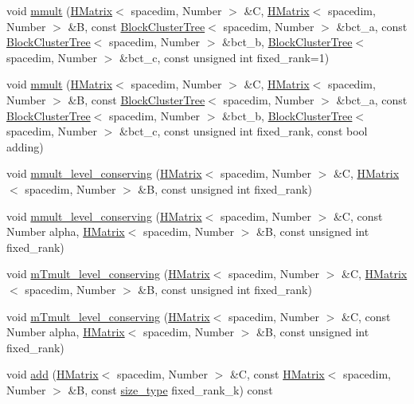 \begin{DoxyCompactItemize}
\item 
void \hyperlink{classHMatrix_af40d53aabc8bec86fa543638d48ba64e}{mmult} (\hyperlink{classHMatrix}{H\+Matrix}$<$ spacedim, Number $>$ \&C, \hyperlink{classHMatrix}{H\+Matrix}$<$ spacedim, Number $>$ \&B, const \hyperlink{classBlockClusterTree}{Block\+Cluster\+Tree}$<$ spacedim, Number $>$ \&bct\+\_\+a, const \hyperlink{classBlockClusterTree}{Block\+Cluster\+Tree}$<$ spacedim, Number $>$ \&bct\+\_\+b, \hyperlink{classBlockClusterTree}{Block\+Cluster\+Tree}$<$ spacedim, Number $>$ \&bct\+\_\+c, const unsigned int fixed\+\_\+rank=1)
\item 
void \hyperlink{classHMatrix_a4139e9069e3b18d4719c527ce2e0414c}{mmult} (\hyperlink{classHMatrix}{H\+Matrix}$<$ spacedim, Number $>$ \&C, \hyperlink{classHMatrix}{H\+Matrix}$<$ spacedim, Number $>$ \&B, const \hyperlink{classBlockClusterTree}{Block\+Cluster\+Tree}$<$ spacedim, Number $>$ \&bct\+\_\+a, const \hyperlink{classBlockClusterTree}{Block\+Cluster\+Tree}$<$ spacedim, Number $>$ \&bct\+\_\+b, \hyperlink{classBlockClusterTree}{Block\+Cluster\+Tree}$<$ spacedim, Number $>$ \&bct\+\_\+c, const unsigned int fixed\+\_\+rank, const bool adding)
\item 
void \hyperlink{classHMatrix_a4ea0317bff2670e3ed7e48416f908873}{mmult\+\_\+level\+\_\+conserving} (\hyperlink{classHMatrix}{H\+Matrix}$<$ spacedim, Number $>$ \&C, \hyperlink{classHMatrix}{H\+Matrix}$<$ spacedim, Number $>$ \&B, const unsigned int fixed\+\_\+rank)
\item 
void \hyperlink{classHMatrix_aefdb7dbcff58654f53a149b94e545bf7}{mmult\+\_\+level\+\_\+conserving} (\hyperlink{classHMatrix}{H\+Matrix}$<$ spacedim, Number $>$ \&C, const Number alpha, \hyperlink{classHMatrix}{H\+Matrix}$<$ spacedim, Number $>$ \&B, const unsigned int fixed\+\_\+rank)
\item 
void \hyperlink{classHMatrix_a0b7fe2940b614a130d154a29b28b39d4}{m\+Tmult\+\_\+level\+\_\+conserving} (\hyperlink{classHMatrix}{H\+Matrix}$<$ spacedim, Number $>$ \&C, \hyperlink{classHMatrix}{H\+Matrix}$<$ spacedim, Number $>$ \&B, const unsigned int fixed\+\_\+rank)
\item 
void \hyperlink{classHMatrix_aae163c33fc8d51f96df712ca192e0b6f}{m\+Tmult\+\_\+level\+\_\+conserving} (\hyperlink{classHMatrix}{H\+Matrix}$<$ spacedim, Number $>$ \&C, const Number alpha, \hyperlink{classHMatrix}{H\+Matrix}$<$ spacedim, Number $>$ \&B, const unsigned int fixed\+\_\+rank)
\item 
void \hyperlink{classHMatrix_a8f96186426cd3147d5af32ca84ad25ea}{add} (\hyperlink{classHMatrix}{H\+Matrix}$<$ spacedim, Number $>$ \&C, const \hyperlink{classHMatrix}{H\+Matrix}$<$ spacedim, Number $>$ \&B, const \hyperlink{classHMatrix_a5ca8dc549783d38371a01ecd621ecb34}{size\+\_\+type} fixed\+\_\+rank\+\_\+k) const

\end{DoxyCompactItemize}
